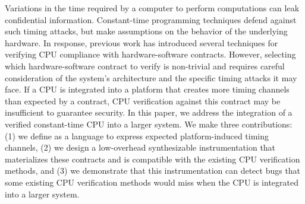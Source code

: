 Variations in the time required by a computer to perform computations can leak confidential information.
Constant-time programming techniques defend against such timing attacks, but make assumptions on the behavior of the underlying hardware.
In response, previous work has introduced several techniques for verifying CPU compliance with hardware-software contracts.
%
However, selecting which hardware-software contract to verify is non-trivial and requires careful consideration of the system's architecture and the specific timing attacks it may face.
If a CPU is integrated into a platform that creates more timing channels than expected by a contract, CPU verification against this contract may be insufficient to guarantee security.
In this paper, we address the integration of a verified constant-time CPU into a larger system.
We make three contributions: (1) we define \pics as a language to express expected platform-induced timing channels, (2) we design a low-overhead synthesizable instrumentation that materializes these contracts and is compatible with the existing CPU verification methods, and (3) we demonstrate that this instrumentation can detect bugs that some existing CPU verification methods would miss when the CPU is integrated into a larger system.

